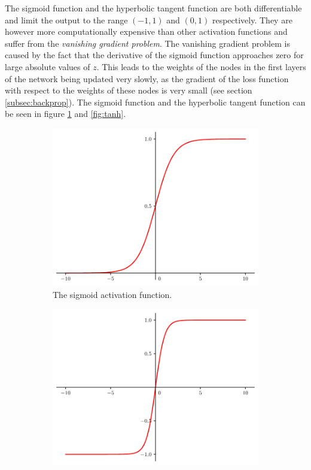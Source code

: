 The sigmoid function and the hyperbolic tangent function are both differentiable and limit the output to the range $(-1, 1)$ and $(0, 1)$ respectively.
They are however more computationally expensive than other activation functions and suffer from the \textit{vanishing gradient problem}.
The vanishing gradient problem is caused by the fact that the derivative of the sigmoid function approaches zero for large absolute values of $z$.
This leads to the weights of the nodes in the first layers of the network being updated very slowly, as the gradient of the loss function with respect to the weights of these nodes is very small (see section \ref{subsec:backprop})\cite[section 1.4.2]{aggarwal_neural_2018}\cite{dubey_activation_2022}.
The sigmoid function and the hyperbolic tangent function can be seen in figure \ref{fig:sigmoid} and \ref{fig:tanh}.
\begin{figure}
    \centering
    \begin{subfigure}[b]{0.45\textwidth}
        \includegraphics[width=\textwidth]{sigmoid}
        \caption{The sigmoid activation function.}
        \label{fig:sigmoid}
    \end{subfigure}
    \hfill
    \begin{subfigure}[b]{0.45\textwidth}
        \includegraphics[width=\textwidth]{tanh}

\end{subfigure}
\end{figure}
